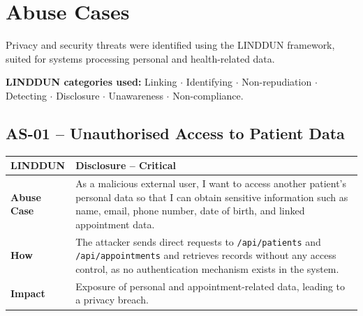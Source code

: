 \documentclass[12pt,a4paper]{report}
\newcommand{\critical}{\textbf{\textcolor{sevcritical}{Critical}}}
\begin{document}
\section{Abuse Cases}

Privacy and security threats were identified using the LINDDUN framework, suited for systems processing personal and health-related data.

\textbf{LINDDUN categories used:} Linking $\cdot$ Identifying $\cdot$ Non-repudiation $\cdot$ Detecting $\cdot$ Disclosure $\cdot$ Unawareness $\cdot$ Non-compliance.

\subsection*{AS-01 -- Unauthorised Access to Patient Data}
\begin{table}[H]
\begin{tabularx}{\linewidth}{>{\bfseries\RaggedRight\arraybackslash}p{2.6cm} X}
\toprule
LINDDUN   & Disclosure -- \critical \\\midrule
Abuse Case & As a malicious external user, I want to access another patient's personal data so that I can obtain sensitive information such as name, email, phone number, date of birth, and linked appointment data. \\\midrule
How        & The attacker sends direct requests to \texttt{/api/patients} and \texttt{/api/\allowbreak{}appointments} and retrieves records without any access control, as no authentication mechanism exists in the system. \\\midrule
Impact     & Exposure of personal and appointment-related data, leading to a privacy breach. \\
\bottomrule
\end{tabularx}
\end{table}
\end{document}
